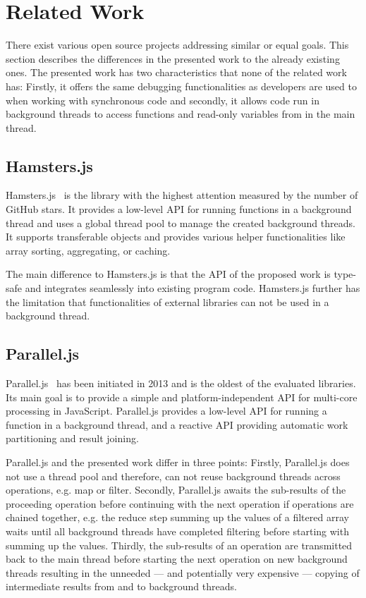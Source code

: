 \section{Related Work}\label{sec:related-work}
There exist various open source projects addressing similar or equal goals. This section describes the differences in the presented work to the already existing ones. The presented work has two characteristics that none of the related work has: Firstly, it offers the same debugging functionalities as developers are used to when working with synchronous code and secondly, it allows code run in background threads to access functions and read-only variables from in the main thread.

\subsection{Hamsters.js}
Hamsters.js~\cite{hamstersjs} is the library with the highest attention measured by the number of GitHub stars. It provides a low-level API for running functions in a background thread and uses a global thread pool to manage the created background threads. It supports transferable objects and provides various helper functionalities like array sorting, aggregating, or caching.

The main difference to Hamsters.js is that the API of the proposed work is type-safe and integrates seamlessly into existing program code. Hamsters.js further has the limitation that functionalities of external libraries can not be used in a background thread.

\subsection{Parallel.js}
Parallel.js~\cite{SavitzkyMayr2016} has been initiated in 2013 and is the oldest of the evaluated libraries. Its main goal is to provide a simple and platform-independent API for multi-core processing in JavaScript. Parallel.js provides a low-level API for running a function in a background thread, and a reactive API providing automatic work partitioning and result joining. 

Parallel.js and the presented work differ in three points: Firstly, Parallel.js does not use a thread pool and therefore, can not reuse background threads across operations, e.g. map or filter. Secondly, Parallel.js awaits the sub-results of the proceeding operation before continuing with the next operation if operations are chained together, e.g. the reduce step summing up the values of a filtered array waits until all background threads have completed filtering before starting with summing up the values. Thirdly, the sub-results of an operation are transmitted back to the main thread before starting the next operation on new background threads resulting in the unneeded --- and potentially very expensive --- copying of intermediate results from and to background threads.


